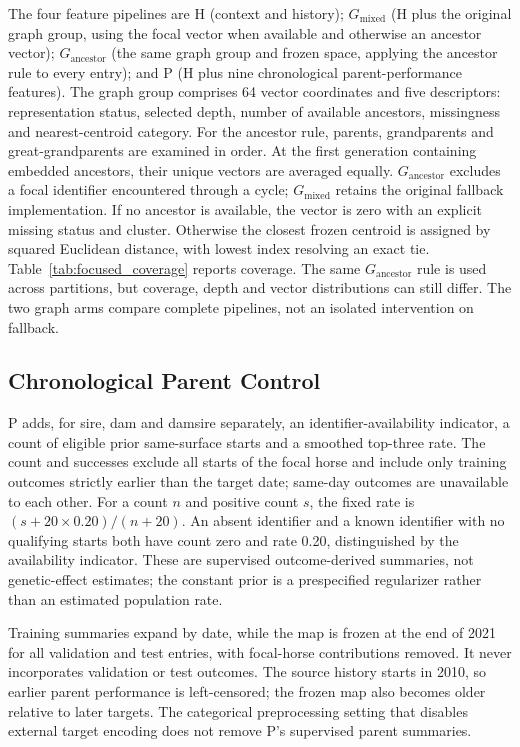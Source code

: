The four feature pipelines are H (context and history); $G_{\mathrm{mixed}}$ (H plus the original graph group, using the focal vector when available and otherwise an ancestor vector); $G_{\mathrm{ancestor}}$ (the same graph group and frozen space, applying the ancestor rule to every entry); and P (H plus nine chronological parent-performance features). The graph group comprises 64 vector coordinates and five descriptors: representation status, selected depth, number of available ancestors, missingness and nearest-centroid category. For the ancestor rule, parents, grandparents and great-grandparents are examined in order. At the first generation containing embedded ancestors, their unique vectors are averaged equally. $G_{\mathrm{ancestor}}$ excludes a focal identifier encountered through a cycle; $G_{\mathrm{mixed}}$ retains the original fallback implementation. If no ancestor is available, the vector is zero with an explicit missing status and cluster. Otherwise the closest frozen centroid is assigned by squared Euclidean distance, with lowest index resolving an exact tie. Table~\ref{tab:focused_coverage} reports coverage. The same $G_{\mathrm{ancestor}}$ rule is used across partitions, but coverage, depth and vector distributions can still differ. The two graph arms compare complete pipelines, not an isolated intervention on fallback.



\subsection{Chronological Parent Control}
P adds, for sire, dam and damsire separately, an identifier-availability indicator, a count of eligible prior same-surface starts and a smoothed top-three rate. The count and successes exclude all starts of the focal horse and include only training outcomes strictly earlier than the target date; same-day outcomes are unavailable to each other. For a count $n$ and positive count $s$, the fixed rate is $(s+20\times0.20)/(n+20)$. An absent identifier and a known identifier with no qualifying starts both have count zero and rate 0.20, distinguished by the availability indicator. These are supervised outcome-derived summaries, not genetic-effect estimates; the constant prior is a prespecified regularizer rather than an estimated population rate.

Training summaries expand by date, while the map is frozen at the end of 2021 for all validation and test entries, with focal-horse contributions removed. It never incorporates validation or test outcomes. The source history starts in 2010, so earlier parent performance is left-censored; the frozen map also becomes older relative to later targets. The categorical preprocessing setting that disables external target encoding does not remove P's supervised parent summaries.

